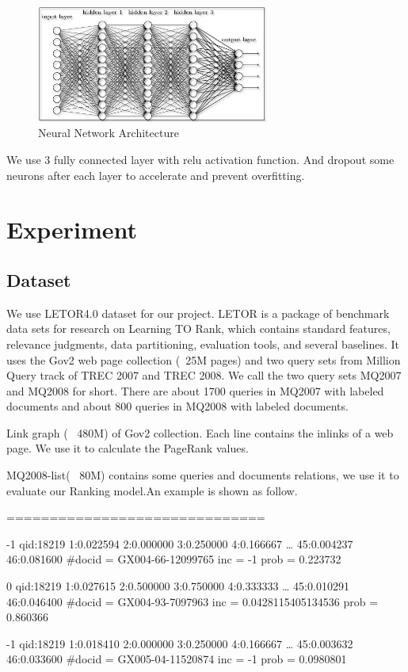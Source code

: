 \documentclass{acmtog} %
\begin{document}
\begin{figure}[htbp]
    \centering
    \includegraphics[width = 3in]{2.png}
    \caption{Neural Network Architecture}
\end{figure}

We use 3 fully connected layer with relu activation function. And dropout some neurons after each layer to accelerate and prevent overfitting.

\section{Experiment}
\subsection{Dataset}
We use LETOR4.0 dataset for our project. LETOR is a package of benchmark data sets for research on Learning TO Rank, which contains standard features, relevance judgments, data partitioning, evaluation tools, and several baselines. It uses the Gov2 web page collection (~25M pages) and two query sets from Million Query track of TREC 2007 and TREC 2008. We call the two query sets MQ2007 and MQ2008 for short. There are about 1700 queries in MQ2007 with labeled documents and about 800 queries in MQ2008 with labeled documents.\cite{ref7}

Link graph (~ 480M) of Gov2 collection. Each line contains the inlinks of a web page. We use it to calculate the PageRank values.

MQ2008-list(~ 80M) contains some queries and documents relations, we use it to evaluate our Ranking model.An example is shown as follow.

==============================

-1 qid:18219 1:0.022594 2:0.000000 3:0.250000 4:0.166667 … 45:0.004237 46:0.081600 #docid = GX004-66-12099765 inc = -1 prob = 0.223732

0 qid:18219 1:0.027615 2:0.500000 3:0.750000 4:0.333333 … 45:0.010291 46:0.046400 #docid = GX004-93-7097963 inc = 0.0428115405134536 prob = 0.860366

-1 qid:18219 1:0.018410 2:0.000000 3:0.250000 4:0.166667 … 45:0.003632 46:0.033600 #docid = GX005-04-11520874 inc = -1 prob = 0.0980801
\end{document}
